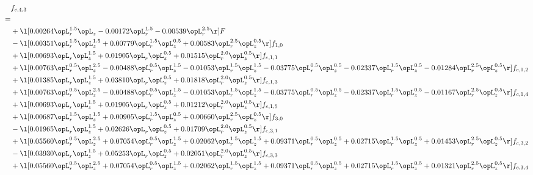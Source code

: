 \begin{alignat}{2} 
\label{eq:f_43_1} 
& f_{c,4,3} \nonumber \\ 
 = \\ 
& + \l[  0.00264 \opL_r^{1.5} \opL_z   -0.00172 \opL_r^{1.5}   -0.00539 \opL_r^{2.5}  \r] F \nonumber \\ 
& - \l[  0.00351 \opL_r^{1.5} \opL_z^{1.5} +  0.00779 \opL_r^{1.5} \opL_z^{0.5} +  0.00583 \opL_r^{2.5} \opL_z^{0.5}  \r] f_{1,0} \nonumber \\ 
& + \l[  0.00693 \opL_r \opL_z^{1.5} +  0.01905 \opL_r \opL_z^{0.5} +  0.01515 \opL_r^{2.0} \opL_z^{0.5}  \r] f_{c,1,1} \nonumber \\ 
& + \l[  0.00763 \opL_r^{0.5} \opL_z^{2.5}   -0.00488 \opL_r^{0.5} \opL_z^{1.5}   -0.01053 \opL_r^{1.5} \opL_z^{1.5}   -0.03775 \opL_r^{0.5} \opL_z^{0.5}   -0.02337 \opL_r^{1.5} \opL_z^{0.5}   -0.01284 \opL_r^{2.5} \opL_z^{0.5}  \r] f_{c,1,2} \nonumber \\ 
& + \l[  0.01385 \opL_r \opL_z^{1.5} +  0.03810 \opL_r \opL_z^{0.5} +  0.01818 \opL_r^{2.0} \opL_z^{0.5}  \r] f_{c,1,3} \nonumber \\ 
& + \l[  0.00763 \opL_r^{0.5} \opL_z^{2.5}   -0.00488 \opL_r^{0.5} \opL_z^{1.5}   -0.01053 \opL_r^{1.5} \opL_z^{1.5}   -0.03775 \opL_r^{0.5} \opL_z^{0.5}   -0.02337 \opL_r^{1.5} \opL_z^{0.5}   -0.01167 \opL_r^{2.5} \opL_z^{0.5}  \r] f_{c,1,4} \nonumber \\ 
& + \l[  0.00693 \opL_r \opL_z^{1.5} +  0.01905 \opL_r \opL_z^{0.5} +  0.01212 \opL_r^{2.0} \opL_z^{0.5}  \r] f_{c,1,5} \nonumber \\ 
& + \l[  0.00687 \opL_r^{1.5} \opL_z^{1.5} +  0.00905 \opL_r^{1.5} \opL_z^{0.5} +  0.00660 \opL_r^{2.5} \opL_z^{0.5}  \r] f_{3,0} \nonumber \\ 
& - \l[  0.01965 \opL_r \opL_z^{1.5} +  0.02626 \opL_r \opL_z^{0.5} +  0.01709 \opL_r^{2.0} \opL_z^{0.5}  \r] f_{c,3,1} \nonumber \\ 
& + \l[  0.05560 \opL_r^{0.5} \opL_z^{2.5} +  0.07054 \opL_r^{0.5} \opL_z^{1.5} +  0.02062 \opL_r^{1.5} \opL_z^{1.5} +  0.09371 \opL_r^{0.5} \opL_z^{0.5} +  0.02715 \opL_r^{1.5} \opL_z^{0.5} +  0.01453 \opL_r^{2.5} \opL_z^{0.5}  \r] f_{c,3,2} \nonumber \\ 
& - \l[  0.03930 \opL_r \opL_z^{1.5} +  0.05253 \opL_r \opL_z^{0.5} +  0.02051 \opL_r^{2.0} \opL_z^{0.5}  \r] f_{c,3,3} \nonumber \\ 
& + \l[  0.05560 \opL_r^{0.5} \opL_z^{2.5} +  0.07054 \opL_r^{0.5} \opL_z^{1.5} +  0.02062 \opL_r^{1.5} \opL_z^{1.5} +  0.09371 \opL_r^{0.5} \opL_z^{0.5} +  0.02715 \opL_r^{1.5} \opL_z^{0.5} +  0.01321 \opL_r^{2.5} \opL_z^{0.5}  \r] f_{c,3,4} \nonumber \\ 

\end{alignat}
